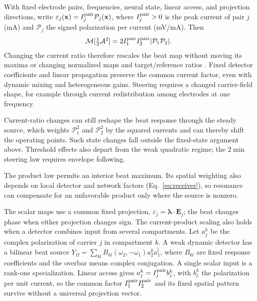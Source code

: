 With fixed electrode pairs, frequencies, neural state, linear access, and
projection directions, write
$\varepsilon_j(\mathbf x)=I_j^{\rm pair}\mathcal P_j(\mathbf x)$,
where $I_j^{\rm pair}>0$ is the peak current of pair $j$ (mA) and $\mathcal P_j$
the signed polarization per current (mV/mA). Then
\[
\mathcal M[\tfrac12\mathcal A^2]
=2I_1^{\rm pair}I_2^{\rm pair}|\mathcal P_1\mathcal P_2|.
\]
Changing the current ratio therefore rescales the beat map without moving its maxima
or changing normalized maps and target/reference ratios
\cite{cassara2025part2}. Fixed detector coefficients and linear propagation
preserve the common current factor, even with dynamic mixing and heterogeneous
gains. Steering requires a changed carrier-field shape, for example through
current redistribution among electrodes at one frequency.

Current-ratio changes can still reshape the beat response through the steady source,
which weights $\mathcal P_1^2$ and $\mathcal P_2^2$ by the squared currents and can
thereby shift the operating points. Such state changes fall outside the fixed-state
argument above. Threshold effects also depart from the weak quadratic regime; the
$2\min$ steering law requires envelope following.

The product law permits an interior beat maximum. Its spatial weighting also
depends on local detector and network factors (Eq.~\eqref{eq:receiver}), so
resonance can compensate for an unfavorable product only where the source
is nonzero.

The scalar maps use a common fixed projection,
$\varepsilon_j=\boldsymbol\lambda\cdot\mathbf E_j$; the beat changes phase
when either projection changes sign. The current-product scaling also holds
when a detector combines input from several compartments. Let $a_j^k$ be the
complex polarization of carrier $j$ in compartment $k$. A weak dynamic
detector has a bilinear beat source
$Y_\Omega=\sum_{kl}B_{kl}(\omega_2,-\omega_1)a_2^k\overline{a_1^l}$,
where $B_{kl}$ are fixed response coefficients and the overbar means complex
conjugation. A single scalar input is a rank-one specialization. Linear
access gives $a_j^k=I_j^{\rm pair}b_j^k$, with $b_j^k$ the polarization per
unit current, so the common factor $I_1^{\rm pair}I_2^{\rm pair}$ and its
fixed spatial pattern survive without a universal projection vector.

